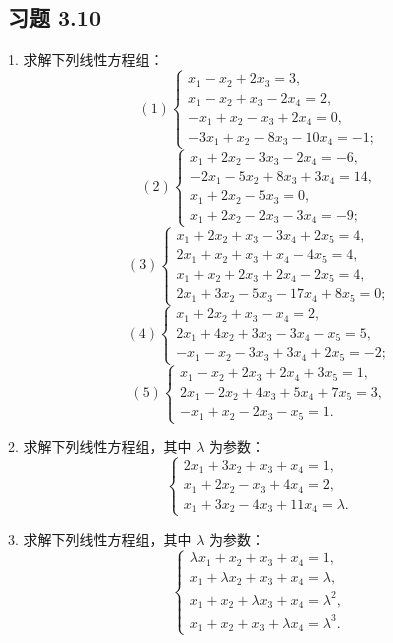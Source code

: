 \documentclass[UTF8,12pt,a4paper,fontset=fandol]{ctexart}
\begin{document}
\subsection*{习题 3.10}

1. 求解下列线性方程组：
\[
(1)\left\{\begin{array}{r}
x_1-x_2+2x_3=3,\\
x_1-x_2+x_3-2x_4=2,\\
-x_1+x_2-x_3+2x_4=0,\\
-3x_1+x_2-8x_3-10x_4=-1;
\end{array}\right.
\]
\[
(2)\left\{\begin{array}{r}
x_1+2x_2-3x_3-2x_4=-6,\\
-2x_1-5x_2+8x_3+3x_4=14,\\
x_1+2x_2-5x_3=0,\\
x_1+2x_2-2x_3-3x_4=-9;
\end{array}\right.
\]
\[
(3)\left\{\begin{array}{r}
x_1+2x_2+x_3-3x_4+2x_5=4,\\
2x_1+x_2+x_3+x_4-4x_5=4,\\
x_1+x_2+2x_3+2x_4-2x_5=4,\\
2x_1+3x_2-5x_3-17x_4+8x_5=0;
\end{array}\right.
\]
\[
(4)\left\{\begin{array}{r}
x_1+2x_2+x_3-x_4=2,\\
2x_1+4x_2+3x_3-3x_4-x_5=5,\\
-x_1-x_2-3x_3+3x_4+2x_5=-2;
\end{array}\right.
\]
\[
(5)\left\{\begin{array}{r}
x_1-x_2+2x_3+2x_4+3x_5=1,\\
2x_1-2x_2+4x_3+5x_4+7x_5=3,\\
-x_1+x_2-2x_3-x_5=1.
\end{array}\right.
\]

2. 求解下列线性方程组，其中 $\lambda$ 为参数：
\[
\left\{\begin{array}{r}
2x_1+3x_2+x_3+x_4=1,\\
x_1+2x_2-x_3+4x_4=2,\\
x_1+3x_2-4x_3+11x_4=\lambda.
\end{array}\right.
\]

3. 求解下列线性方程组，其中 $\lambda$ 为参数：
\[
\left\{\begin{array}{r}
\lambda x_1+x_2+x_3+x_4=1,\\
x_1+\lambda x_2+x_3+x_4=\lambda,\\
x_1+x_2+\lambda x_3+x_4=\lambda^2,\\
x_1+x_2+x_3+\lambda x_4=\lambda^3.
\end{array}\right.
\]
\end{document}
